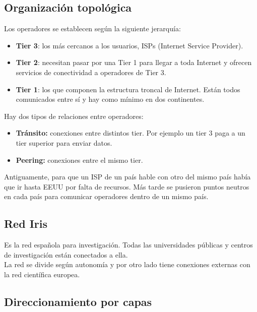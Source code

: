 \subsection{Organización topológica}

Los operadores se establecen según la siguiente jerarquía:
\begin{itemize}
    \item \textbf{Tier 3}: los más cercanos a los usuarios, ISPs (Internet Service Provider).
    \item \textbf{Tier 2}: necesitan pasar por una Tier 1 para llegar a toda Internet y ofrecen servicios de conectividad a operadores de Tier 3.
    \item \textbf{Tier 1}: los que componen la estructura troncal de Internet. Están todos comunicados entre sí y hay como mínimo en dos continentes. 
\end{itemize}

Hay dos tipos de relaciones entre operadores:
\begin{itemize}
    \item \textbf{Tránsito:} conexiones entre distintos tier. Por ejemplo un tier 3 paga a un tier superior para enviar datos. 
    \item \textbf{Peering:} conexiones entre el mismo tier. 
\end{itemize}

Antiguamente, para que un ISP de un país hable con otro del mismo país había que ir hasta EEUU por falta de recursos. Más tarde se pusieron puntos neutros en cada país para comunicar operadores dentro de un mismo país. 


\subsection{Red Iris}

Es la red española para investigación. Todas las universidades públicas y centros de investigación están conectados a ella. \\

La red se divide según autonomía y por otro lado tiene conexiones externas con la red científica europea. 


\subsection{Direccionamiento por capas}

